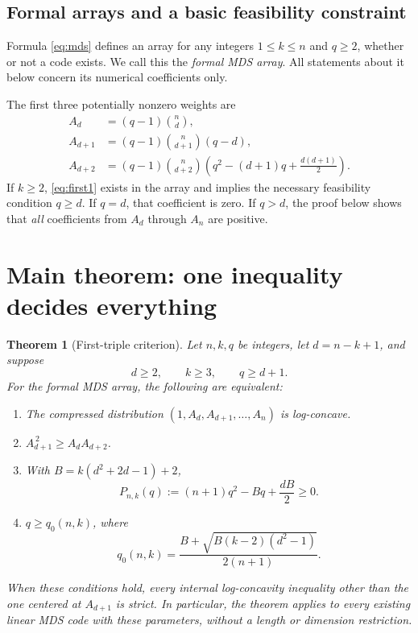 \documentclass[11pt,letterpaper]{article}
\numberwithin{equation}{section}
\newtheorem{theorem}{Theorem}[section]
\theoremstyle{definition}
\begin{document}
\subsection{Formal arrays and a basic feasibility constraint}
Formula \eqref{eq:mds} defines an array for any integers
$1\le k\le n$ and $q\ge2$, whether or not a code exists. We call this
the \emph{formal MDS array}. All statements about it below concern
its numerical coefficients only.

The first three potentially nonzero weights are
\begin{align}
 A_d&=(q-1)\binom nd,\label{eq:first0}\\
 A_{d+1}&=(q-1)\binom n{d+1}(q-d),\label{eq:first1}\\
 A_{d+2}&=(q-1)\binom n{d+2}
     \left(q^2-(d+1)q+\frac{d(d+1)}2\right).
     \label{eq:first2}
\end{align}
If $k\ge2$, \eqref{eq:first1} exists in the array and implies the
necessary feasibility condition $q\ge d$. If $q=d$, that coefficient
is zero. If $q>d$, the proof below shows that \emph{all} coefficients
from $A_d$ through $A_n$ are positive.

\section{Main theorem: one inequality decides everything}

\begin{theorem}[First-triple criterion]\label{thm:main}
Let $n,k,q$ be integers, let $d=n-k+1$, and suppose
\[
 d\ge2,\qquad k\ge3,\qquad q\ge d+1.
\]
For the formal MDS array, the following are equivalent:
\begin{enumerate}[label=(\roman*)]
\item The compressed distribution $(1,A_d,A_{d+1},\ldots,A_n)$ is
log-concave.
\item $A_{d+1}^{\,2}\ge A_dA_{d+2}$.
\item With $B=k(d^2+2d-1)+2$,
\begin{equation}\label{eq:P}
 P_{n,k}(q):=(n+1)q^2-Bq+\frac{dB}{2}\ge0.
\end{equation}
\item $q\ge q_0(n,k)$, where
\begin{equation}\label{eq:root}
 q_0(n,k)=
 \frac{B+\sqrt{B(k-2)(d^2-1)}}{2(n+1)}.
\end{equation}
\end{enumerate}
When these conditions hold, every internal log-concavity inequality
other than the one centered at $A_{d+1}$ is strict.
In particular, the theorem applies to every existing linear MDS code
with these parameters, without a length or dimension restriction.
\end{theorem}
\end{document}
